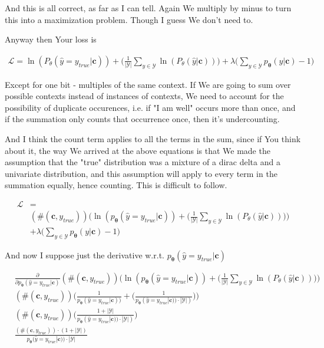 \documentclass{article}
\newcommand{\vtheta}{\boldsymbol{\theta}}
\newcommand{\model}{p_{\vtheta}}
\newcommand{\context}{\boldsymbol{c}}
\begin{document}
		And this is all correct, as far as I can tell. Again We multiply by minus to turn this into a maximization problem. Though I guess We don't need to.
		
		Anyway then Your loss is
		
		\begin{align}
			\mathcal{L} = \ln(P_\theta(\hat{y} = y_{true}|\context)) + \bigg(\frac{1}{|\mathcal{Y}|} \sum_{y\in\mathcal{Y}} \ln(P_\theta(\hat{y} | \context) )\bigg) + \lambda\bigg(\sum_{y\in\mathcal{Y}}\model(y|\context) - 1 \bigg)
		\end{align}
		
		Except for one bit - multiples of the same context. If We are going to sum over possible contexts instead of instances of contexts, We need to account for the possibility of duplicate occurences, i.e. if "I am well" occurs more than once, and if the summation only counts that occurrence once, then it's undercounting. 
		
		And I think the count term applies to all the terms in the sum, since if You think about it, the way We arrived at the above equations is that We made the assumption that the "true" distribution was a mixture of a dirac delta and a univariate distribution, and this assumption will apply to every term in the summation equally, hence counting. This is difficult to follow.
		
		\begin{align}
			\mathcal{L} &=\\			
			&(\#(\context, y_{true}))\bigg(\ln(\model(\hat{y} = y_{true}|\context)) + \bigg(\frac{1}{|\mathcal{Y}|} \sum_{y\in\mathcal{Y}} \ln(P_\theta(\hat{y} | \context) )\bigg)\bigg) \\
			&+ \lambda\bigg(\sum_{y\in\mathcal{Y}}\model(y|\context) - 1 \bigg)
		\end{align}
		
		And now I suppose just the derivative w.r.t. $\model(\hat{y} = y_{true}|\context)$
		
		\begin{align}
			&\frac{\partial}{\partial \model(\hat{y} = y_{true}|\context)} (\#(\context, y_{true}))\bigg(\ln(\model(\hat{y} = y_{true}|\context)) + \bigg(\frac{1}{|\mathcal{Y}|} \sum_{y\in\mathcal{Y}} \ln(P_\theta(\hat{y} | \context) )\bigg)\bigg)\\
			&(\#(\context, y_{true}))\bigg(\frac{1}{\model(\hat{y} = y_{true}|\context))} + \bigg( \frac{1}{\model(\hat{y} = y_{true}|\context)) \cdot |\mathcal{Y}| )}\bigg)\bigg)\\
			&(\#(\context, y_{true})) \bigg( \frac{1 + |\mathcal{Y}|}{\model(\hat{y} = y_{true}|\context)) \cdot |\mathcal{Y}| )}\bigg)\\
			& \frac{(\#(\context, y_{true}))\cdot (1 + |\mathcal{Y}|)}{\model(\hat{y} = y_{true}|\context)) \cdot |\mathcal{Y}|}
		\end{align}
		
\end{document}
